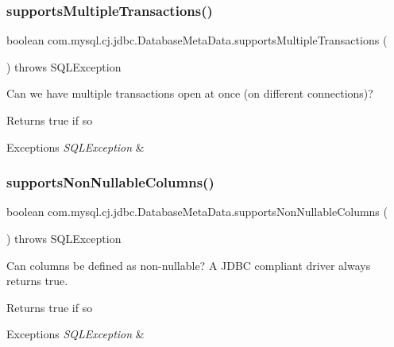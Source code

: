 \subsubsection{\texorpdfstring{supports\+Multiple\+Transactions()}{supportsMultipleTransactions()}}
{\footnotesize\ttfamily boolean com.\+mysql.\+cj.\+jdbc.\+Database\+Meta\+Data.\+supports\+Multiple\+Transactions (\begin{DoxyParamCaption}{ }\end{DoxyParamCaption}) throws S\+Q\+L\+Exception}

Can we have multiple transactions open at once (on different connections)?

\begin{DoxyReturn}{Returns}
true if so 
\end{DoxyReturn}

\begin{DoxyExceptions}{Exceptions}
{\em S\+Q\+L\+Exception} & \\
\hline
\end{DoxyExceptions}
\mbox{\label{classcom_1_1mysql_1_1cj_1_1jdbc_1_1_database_meta_data_ac93acbd1e24b19de7e90e19cf61218a6}} 
\subsubsection{\texorpdfstring{supports\+Non\+Nullable\+Columns()}{supportsNonNullableColumns()}}
{\footnotesize\ttfamily boolean com.\+mysql.\+cj.\+jdbc.\+Database\+Meta\+Data.\+supports\+Non\+Nullable\+Columns (\begin{DoxyParamCaption}{ }\end{DoxyParamCaption}) throws S\+Q\+L\+Exception}

Can columns be defined as non-\/nullable? A J\+D\+BC compliant driver always returns true.

\begin{DoxyReturn}{Returns}
true if so 
\end{DoxyReturn}

\begin{DoxyExceptions}{Exceptions}
{\em S\+Q\+L\+Exception} & \\
\hline
\end{DoxyExceptions}
\mbox{\label{classcom_1_1mysql_1_1cj_1_1jdbc_1_1_database_meta_data_a3b76cdd70d934791899e12a59e365a10}} 
